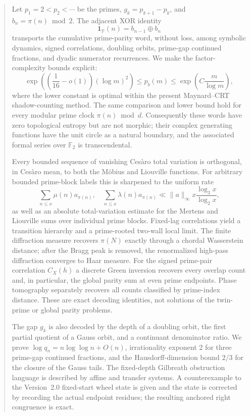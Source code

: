 \documentclass[11pt]{article}
\theoremstyle{definition}
\theoremstyle{remark}
\newcommand{\PP}{\mathbb P}
\newcommand{\Ftwo}{\mathbb F_{2}}
\newcommand{\one}{\mathbf 1}
\begin{document}
\begin{abstract}
Let $p_1=2<p_2<\cdots$ be the primes, $g_k=p_{k+1}-p_k$, and
$b_n=\pi(n)\bmod 2$.  The adjacent XOR identity
\[
  \one_{\PP}(n)=b_{n-1}\oplus b_n
\]
transports the cumulative prime-parity word, without loss, among symbolic dynamics,
signed correlations, doubling orbits, prime-gap continued fractions, and dyadic
numerator recurrences.  We make the factor-complexity bounds explicit:
\[
 \exp\!\left(\left(\frac1{16}-o(1)\right)(\log m)^2\right)
 \le p_b(m)\le \exp\!\left(C\frac{m}{\log m}\right),
\]
where the lower constant is optimal within the present Maynard--CRT shadow-counting
method.  The same comparison and lower bound hold for every modular prime clock
$\pi(n)\bmod d$.  Consequently these words have zero topological entropy but are not
morphic; their complex generating functions have the unit circle as a natural boundary,
and the associated formal series over $\Ftwo$ is transcendental.

Every bounded sequence of vanishing Ces\`aro total variation is orthogonal, in Ces\`aro
mean, to both the M\"obius and Liouville functions.  For arbitrary bounded prime-block
labels this is sharpened to the uniform rate
\[
 \sum_{n\le x}\mu(n)a_{\pi(n)},\quad
 \sum_{n\le x}\lambda(n)a_{\pi(n)}
 \ll \lVert a\rVert_\infty x\frac{\log_3x}{\log_2x},
\]
as well as an absolute total-variation estimate for the Mertens and Liouville sums over
individual prime blocks.  Fixed-lag correlations yield a transition hierarchy and a
prime-rooted two-wall local limit.  The finite diffraction measure recovers $\pi(N)$
exactly through a chordal Wasserstein distance; after the Bragg peak is removed, the
renormalized high-pass diffraction converges to Haar measure.  For the signed prime-pair
correlation $C_X(h)$ a discrete Green inversion recovers every overlap count and, in
particular, the global parity sum at even prime endpoints.  Phase tomography separately
recovers all counts classified by prime-index distance.  These are exact decoding
identities, not solutions of the twin-prime or global parity problems.

The gap $g_k$ is also decoded by the depth of a doubling orbit, the first partial
quotient of a Gauss orbit, and a continuant denominator ratio.  We prove
$\log q_n=n\log\log n+O(n)$, irrationality exponent $2$ for three prime-gap continued
fractions, and the Hausdorff-dimension bound $2/3$ for the closure of the Gauss tails.
The fixed-depth Gilbreath obstruction language is described by affine and transfer
systems.  A counterexample to the Version~2.0 fixed-start wheel state is given and the
state is corrected by recording the actual endpoint residues; the resulting anchored
right congruence is exact.


\end{abstract}
\end{document}
